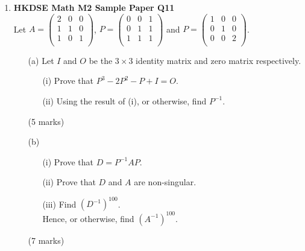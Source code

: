 \documentclass[12pt]{article}
\begin{document}
\begin{enumerate}
	\item \textbf{HKDSE Math M2 Sample Paper Q11}\\
	Let $A = \begin{pmatrix}
		2 & 0 & 0\\
		1 & 1 & 0\\
		1 & 0 & 1\\
	\end{pmatrix}$, $P = \begin{pmatrix}
		0 & 0 & 1\\
		0 & 1 & 1\\
		1 & 1 & 1\\
	\end{pmatrix}$ and $P = \begin{pmatrix}
		1 & 0 & 0\\
		0 & 1 & 0\\
		0 & 0 & 2\\
	\end{pmatrix}$.
	\begin{enumerate}
		\item [(a)]Let $I$ and $O$ be the $3\times3$ identity matrix and zero matrix respectively. 
		\begin{enumerate}
			\item [(i)]Prove that $P^3 -2P^2 - P + I = O$.
			\item [(ii)]Using the result of (i), or otherwise, find $P^{-1}$.
		\end{enumerate}
		(5 marks)
		\item [(b)]
		\begin{enumerate}
			\item [(i)]Prove that $D = P^{-1}AP$. 
			\item [(ii)]Prove that $D$ and $A$ are non-singular. 
			\item [(iii)]Find $(D^{-1})^{100}$. \\
			Hence, or otherwise, find $(A^{-1})^{100}$.
		\end{enumerate}
		(7 marks)
	\end{enumerate}



\end{enumerate}
\end{document}
